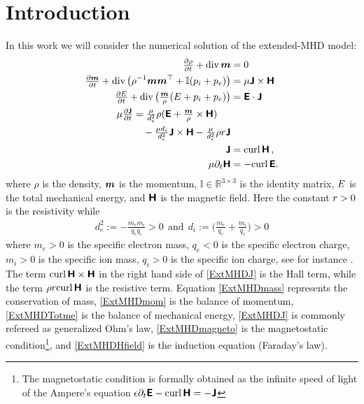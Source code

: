 \documentclass[preprint,1p]{elsarticle}
\begin{document}
\section{Introduction}\label{sec:intro}

In this work we will consider the numerical solution of the
extended-MHD model:
\begin{subequations}
\label{ExtMHD}
\begin{align}
\label{ExtMHDmass}
\tfrac{\partial \rho}{\partial t} + \diver{}\mom &= 0 \\
%
\label{ExtMHDmom}
\tfrac{\partial \mom}{\partial t} + \diver{}
\big( \rho^{-1} \mom\mom^\transp
+ \mathbb{I} (p_i + p_e) \big)
&=
\mu \current \times \Hfield \\
%
\label{ExtMHDTotme}
\tfrac{\partial \totme}{\partial t} + \diver{}\big( \tfrac{\mom}{\rho} (\totme +
p_i + p_e) \big)
&= \Efield \cdot\current \\
%
%
\label{ExtMHDJ}
\begin{split}
\mu \tfrac{\partial \current}{\partial t}
&= \tfrac{\mu}{d_e^2} \rho( \Efield + \tfrac{\mom}{\rho} \times \Hfield) \\
%
& \ \ \ - \tfrac{\mu d_i}{d_e^2} \current \times \Hfield
- \tfrac{\mu}{d_e^2} \rho \resist \current
\end{split} \\
%
\label{ExtMHDmagneto}
\current &= \curl{}\Hfield    \, , \\
%
\label{ExtMHDHfield}
\mu \partial_t \Hfield  &= - \curl{}\Efield .
\end{align}
\end{subequations}
where $\rho$ is the density, $\boldsymbol{m}$ is the momentum, $\mathbb{I} \in
\mathbb{R}^{3 \times 3}$ is the identity matrix, $E$ is the total
mechanical energy, and $\boldsymbol{\mathsf{H}}$ is the magnetic field. Here the constant
$r > 0$ is the resistivity while
\begin{align}
\label{dediDef}
d_e^2 := - \tfrac{m_e m_i}{q_e q_i} > 0
  \ \ \text{and} \ \
d_i := \big(\tfrac{m_e}{q_e} + \tfrac{m_i}{q_i}\big) > 0
\end{align}
where $m_e > 0 $ is the specific electron mass, $q_e < 0 $ is the specific
electron charge, $m_i > 0 $ is the specific ion mass, $q_i > 0$ is the
specific ion charge, see for instance \cite[p. 90]{Krall1974}. The term
$\text{curl} \, \mathbf{}\boldsymbol{\mathsf{H}} \times \boldsymbol{\mathsf{H}}$ in the right hand side of \eqref{ExtMHDJ}
is the Hall term, while the term $\rho r \text{curl} \, \mathbf{}\boldsymbol{\mathsf{H}}$ is the
resistive term. Equation \eqref{ExtMHDmass} represents the conservation of
mass, \eqref{ExtMHDmom} is the balance of momentum, \eqref{ExtMHDTotme} is the
balance of mechanical energy, \eqref{ExtMHDJ} is commonly refereed as
generalized Ohm's law,  \eqref{ExtMHDmagneto} is the magnetostatic
condition\footnote{The magnetostatic condition is formally obtained as the
infinite speed of light of the Ampere's equation $\epsilon \partial_t \boldsymbol{\mathsf{E}} -
\text{curl} \, \mathbf{}\boldsymbol{\mathsf{H}} = - \boldsymbol{\mathsf{J}}$}, and \eqref{ExtMHDHfield} is the induction
equation (Faraday's law).
\end{document}

